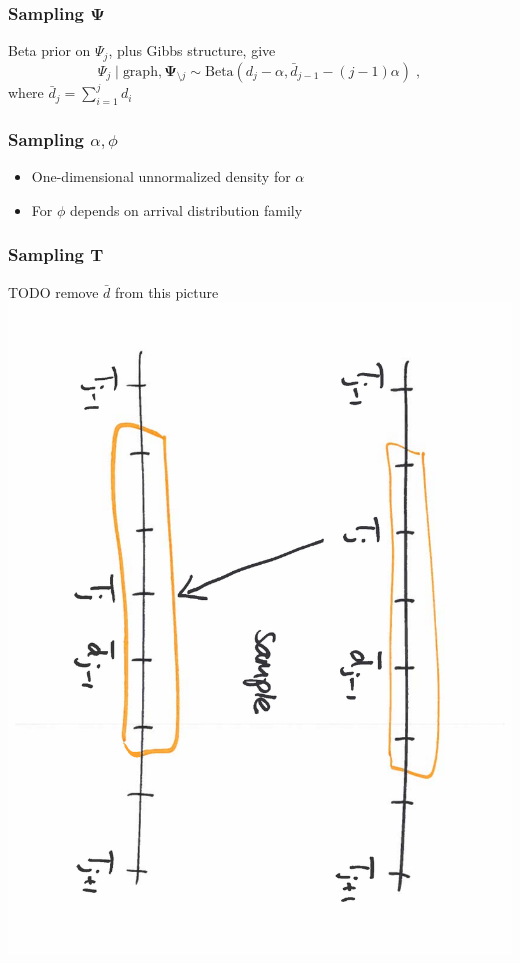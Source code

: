\documentclass[final,hyperref={pdfpagelabels=false},noamsthm]{beamer}
\newcommand{\bfT}{\mathbf{T}}
\newcommand{\bfPsi}{\boldsymbol{\Psi}}
\begin{document}
\begin{frame}
	\frametitle{Sampling $\bfPsi$}
	Beta prior on $\Psi_j$, plus Gibbs structure, give
	\begin{equation*}
	\Psi_j \mid \text{graph}, \bfPsi_{\setminus j} \sim \text{Beta}(d_{j} - \alpha, \bar{d}_{j-1} - (j-1)\alpha) \;,
	\end{equation*}
	\small{where $\bar{d}_j = \sum_{i=1}^j d_i$}
\end{frame}

\begin{frame}
	\frametitle{Sampling $\alpha,\phi$}
	\begin{itemize}
		\item One-dimensional unnormalized density for $\alpha$
		\item For $\phi$ depends on arrival distribution family
	\end{itemize}

\end{frame}

\begin{frame}
	\frametitle{Sampling $\bfT$}
	TODO remove $\bar{d}$ from this picture
	\includegraphics[angle=90,origin=c,scale=0.4]{fig/tsampling}
\end{frame}
\end{document}
